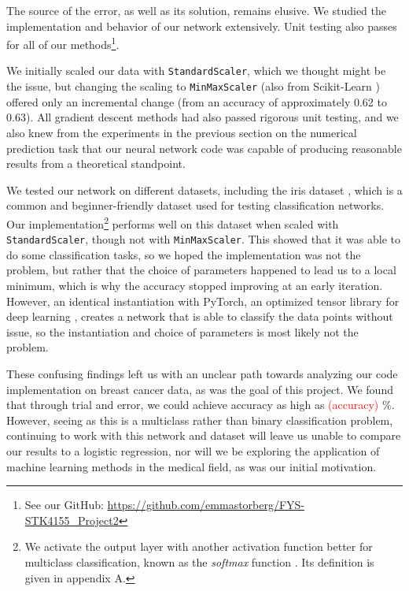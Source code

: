 The source of the error, as well as its solution, remains elusive. We studied the implementation and behavior of our network extensively. Unit testing also passes for all of our methods\footnote{See our GitHub: \url{https://github.com/emmastorberg/FYS-STK4155_Project2}}.  

We initially scaled our data with \texttt{StandardScaler}, which we thought might be the issue, but changing the scaling to \texttt{MinMaxScaler} (also from Scikit-Learn \cite{sklearnScaling}) offered only an incremental change (from an accuracy of approximately 0.62 to 0.63). All gradient descent methods had also passed rigorous unit testing, and we also knew from the experiments in the previous section on the numerical prediction task that our neural network code was capable of producing reasonable results from a theoretical standpoint. 

We tested our network on different datasets, including the iris dataset \cite{irisdataset}, which is a common and beginner-friendly dataset used for testing classification networks. Our implementation\footnote{We activate the output layer with another activation function better for multiclass classification, known as the \emph{softmax} function \cite{softmax}. Its definition is given in appendix A.} performs well on this dataset when scaled with \texttt{StandardScaler}, though not with \texttt{MinMaxScaler}. This showed that it was able to do some classification tasks, so we hoped the implementation was not the problem, but rather that the choice of parameters happened to lead us to a local minimum, which is why the accuracy stopped improving at an early iteration. However, an identical instantiation with PyTorch, an optimized tensor library for deep learning \cite{pytorch}, creates a network that is able to classify the data points without issue, so the instantiation and choice of parameters is most likely not the problem.

These confusing findings left us with an unclear path towards analyzing our code implementation on breast cancer data, as was the goal of this project. We found that through trial and error, we could achieve accuracy as high as \textcolor{red}{(accuracy)} \%. However, seeing as this is a multiclass rather than binary classification problem, continuing to work with this network and dataset will leave us unable to compare our results to a logistic regression, nor will we be exploring the application of machine learning methods in the medical field, as was our initial motivation.

